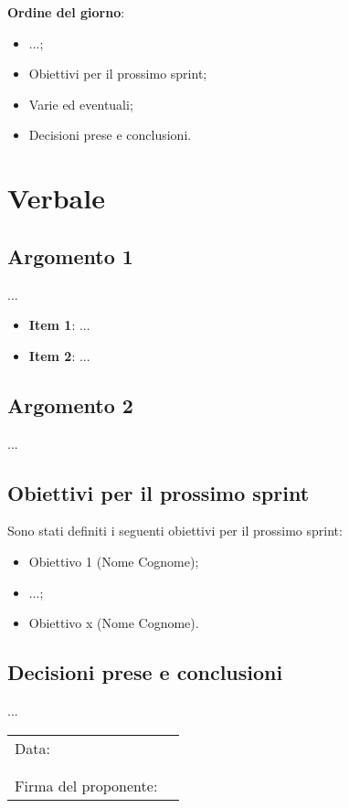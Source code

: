 \documentclass[italian,12pt]{article}
\begin{document}
\raggedright
\textbf{Ordine del giorno}:
\begin{itemize}
	\item ...;
	\item Obiettivi per il prossimo sprint;
	\item Varie ed eventuali;
	\item Decisioni prese e conclusioni.
\end{itemize}

\newpage

\section{Verbale}

\subsection{Argomento 1}
...
\begin{itemize}
	\item \textbf{Item 1}: ...
	\item \textbf{Item 2}: ...
\end{itemize}

\subsection{Argomento 2}
...

\subsection{Obiettivi per il prossimo sprint}
Sono stati definiti i seguenti obiettivi per il prossimo sprint:
\begin{itemize}
	\item Obiettivo 1 (Nome Cognome);
	\item ...;
	\item Obiettivo x (Nome Cognome). 
\end{itemize}

\subsection{Decisioni prese e conclusioni}
...

\newpage
\begin{table}[b]
	\begin{tabular}{@{}p{5cm}p{10cm}@{}}
		Data:                 & \hrulefill \\
		                      &            \\
		                      &            \\
		Firma del proponente: & \hrulefill \\
	\end{tabular}
\end{table}
\end{document}
